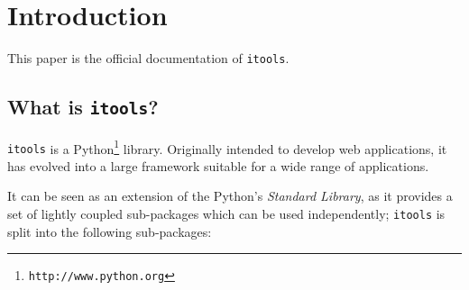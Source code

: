 \chapter{Introduction}

This paper is the official documentation of {\tt itools}.

\section{What is {\tt itools}?}

{\tt itools} is a Python\footnote{\tt http://www.python.org} library.
Originally intended to develop web applications, it has evolved into
a large framework suitable for a wide range of applications.

It can be seen as an extension of the Python's {\em Standard Library},
as it provides a set of lightly coupled sub-packages which can be used
independently; {\tt itools} is split into the following sub-packages:

